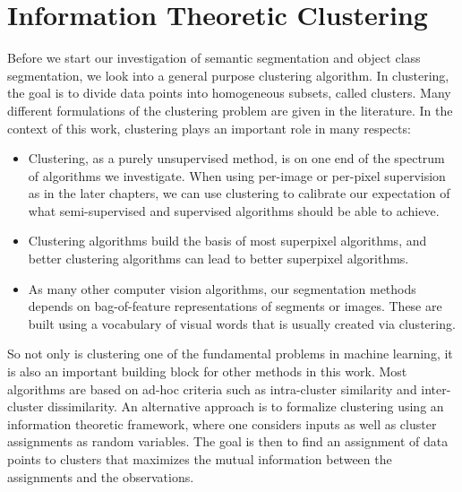 \chapter{Information Theoretic Clustering}\label{ch:itm}

Before we start our investigation of semantic segmentation and object class segmentation,
we look into a general purpose clustering algorithm.
%
In clustering, the goal is to divide data points into homogeneous subsets, called
clusters.
Many different formulations of the clustering problem are given in the literature.
%
In the context of this work, clustering plays an important role in many respects:
\begin{itemize}
    \item Clustering, as a purely unsupervised method, is on one end of the
        spectrum of algorithms we investigate.  When using per-image or
        per-pixel supervision as in the later chapters, we can use clustering
        to calibrate our expectation of what semi-supervised and supervised
        algorithms should be able to achieve.

    \item Clustering algorithms build the basis of most superpixel algorithms, and
        better clustering algorithms can lead to better superpixel algorithms.

    \item As many other computer vision algorithms, our segmentation methods
        depends on bag-of-feature representations of segments or images. These
        are built using a vocabulary of visual words that is usually created
        via clustering.
\end{itemize}

So not only is clustering one of the fundamental problems in machine learning, it is also
an important building block for other methods in this work.
%
Most algorithms are based on ad-hoc criteria such as intra-cluster similarity
and inter-cluster dissimilarity.
An alternative approach is to formalize clustering using an information
theoretic framework, where one considers inputs as well as cluster assignments
as random variables.  The goal is then to find an assignment of data points to
clusters that maximizes the mutual information between the assignments and the
observations.

